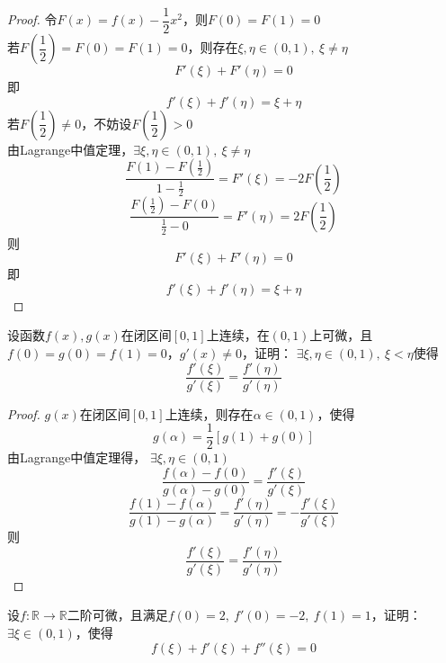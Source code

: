 \begin{proof}

    令$F(x) = f(x) - \dfrac{1}{2}x^2$，则$F(0) = F(1) = 0$\\
    若$F\left( \dfrac{1}{2} \right) = F(0) = F(1) = 0$，则存在$\xi,\eta \in (0,1),\ \xi \neq \eta$
    $$F'(\xi) + F'(\eta) = 0$$
    即
    $$f'(\xi) + f'(\eta) = \xi + \eta$$
    若$F\left( \dfrac{1}{2} \right) \neq 0$，不妨设$F\left( \dfrac{1}{2} \right) > 0$\\
    由\textup{Lagrange}中值定理，$\exists \xi,\eta \in (0,1),\ \xi \neq \eta$
    $$ \dfrac{F(1) - F(\frac{1}{2})}{1 - \frac{1}{2}} = F'(\xi) = -2F\left( \dfrac{1}{2} \right)$$
    $$ \dfrac{F(\frac{1}{2}) - F(0)}{\frac{1}{2} - 0} = F'(\eta) = 2F\left( \dfrac{1}{2} \right)$$
    则
    $$F'(\xi) + F'(\eta) = 0$$
    即
    $$f'(\xi) + f'(\eta) = \xi + \eta$$

\end{proof}

\begin{proposition}

    设函数$f(x),g(x)$在闭区间$[0,1]$上连续，在$(0,1)$上可微，且$f(0) = g(0) = f(1) = 0$，$g'(x) \neq 0$，证明： $\exists \xi,\eta \in (0,1),\ \xi < \eta$使得
    $$\dfrac{f'(\xi)}{g'(\xi)} = \dfrac{f'(\eta)}{g'(\eta)}$$

\end{proposition}

\begin{proof}

    $g(x)$在闭区间$[0,1]$上连续，则存在$\alpha \in (0,1)$，使得
    $$g(\alpha) = \dfrac{1}{2}[g(1) + g(0)]$$
    由\textup{Lagrange}中值定理得， $\exists \xi,\eta \in (0,1)$
    $$\dfrac{f(\alpha) - f(0)}{g(\alpha) - g(0)} = \dfrac{f'(\xi)}{g'(\xi)}$$
    $$\dfrac{f(1) - f(\alpha)}{g(1) - g(\alpha)} = \dfrac{f'(\eta)}{g'(\eta)} = -\dfrac{f'(\xi)}{g'(\xi)}$$
    则
    $$\dfrac{f'(\xi)}{g'(\xi)} = \dfrac{f'(\eta)}{g'(\eta)}$$

\end{proof}

\begin{proposition}

    设$f:\mathbb{R}\to\mathbb{R}$二阶可微，且满足$f(0) = 2,\ f'(0) = -2,\ f(1) = 1$，证明：$\exists \xi \in (0,1)$，使得
    $$f(\xi) + f'(\xi) + f''(\xi) = 0$$

\end{proposition}

